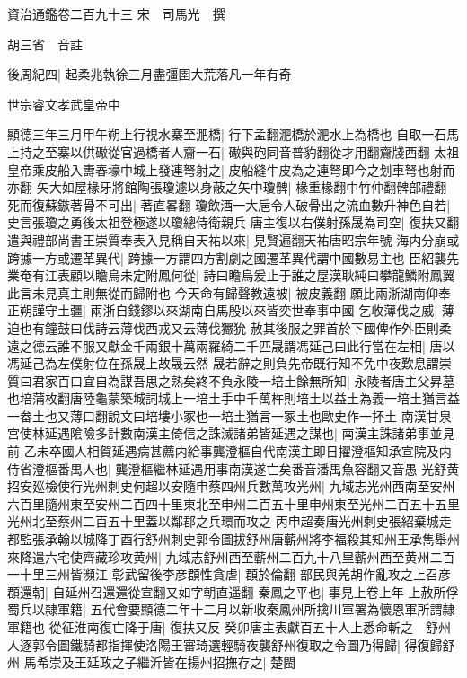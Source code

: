資治通鑑卷二百九十三
宋　司馬光　撰

胡三省　音註

後周紀四|{
	起柔兆執徐三月盡彊圉大荒落凡一年有奇}


世宗睿文孝武皇帝中

顯德三年三月甲午朔上行視水寨至淝橋|{
	行下孟翻淝橋於淝水上為橋也}
自取一石馬上持之至寨以供礮從官過橋者人齎一石|{
	礮與砲同音普豹翻從才用翻齎牋西翻}
太祖皇帝乘皮船入夀春壕中城上發連弩射之|{
	皮船縫牛皮為之連弩即今之划車弩也射而亦翻}
矢大如屋椽牙將館陶張瓊遽以身蔽之矢中瓊髀|{
	椽重椽翻中竹仲翻髀部禮翻}
死而復蘇鏃著骨不可出|{
	著直畧翻}
瓊飲酒一大巵令人破骨出之流血數升神色自若|{
	史言張瓊之勇後太祖登極遂以瓊總侍衛親兵}
唐主復以右僕射孫晟為司空|{
	復扶又翻}
遣與禮部尚書王崇質奉表入見稱自天祐以來|{
	見賢遍翻天祐唐昭宗年號}
海内分崩或跨據一方或遷革異代|{
	跨據一方謂四方割劇之國遷革異代謂中國數易主也}
臣紹襲先業奄有江表顧以瞻烏未定附鳳何從|{
	詩曰瞻烏爰止于誰之屋漢耿純曰攀龍鱗附鳳翼此言未見真主則無從而歸附也}
今天命有歸聲教遠被|{
	被皮義翻}
願比兩浙湖南仰奉正朔謹守土疆|{
	兩浙自錢鏐以來湖南自馬殷以來皆奕世奉事中國}
乞收薄伐之威|{
	薄迫也有鐘鼓曰伐詩云薄伐西戎又云薄伐玁狁}
赦其後服之罪首於下國俾作外臣則柔遠之德云誰不服又獻金千兩銀十萬兩羅綺二千匹晟謂馮延己曰此行當在左相|{
	唐以馮延己為左僕射位在孫晟上故晟云然}
晟若辭之則負先帝既行知不免中夜歎息謂崇質曰君家百口宜自為謀吾思之熟矣終不負永陵一培土餘無所知|{
	永陵者唐主父昇墓也培蒲枚翻唐陸龜蒙築城詞城上一培土手中千萬杵則培土以益土為義一培土猶言益一畚土也又薄口翻說文曰培塿小冢也一培土猶言一冢土也歐史作一抔土}
南漢甘泉宫使林延遇隂險多計數南漢主倚信之誅滅諸弟皆延遇之謀也|{
	南漢主誅諸弟事並見前}
乙未卒國人相賀延遇病甚薦内給事龔澄樞自代南漢主即日擢澄樞知承宣院及内侍省澄樞番禺人也|{
	龔澄樞繼林延遇用事南漢遂亡矣番音潘禺魚容翻又音愚}
光舒黄招安廵檢使行光州刺史何超以安隨申蔡四州兵數萬攻光州|{
	九域志光州西南至安州六百里隨州東至安州二百四十里東北至申州二百五十里申州東至光州二百五十五里光州北至蔡州二百五十里蓋以鄰郡之兵環而攻之}
丙申超奏唐光州刺史張紹棄城走都監張承翰以城降丁酉行舒州刺史郭令圖拔舒州唐蘄州將李福殺其知州王承雋舉州來降遣六宅使齊藏珍攻黄州|{
	九域志舒州西至蘄州二百九十八里蘄州西至黄州二百一十里三州皆瀕江}
彰武留後李彦頵性貪虐|{
	頵於倫翻}
部民與羌胡作亂攻之上召彦頵還朝|{
	自延州召還還從宣翻又如字朝直遥翻}
秦鳳之平也|{
	事見上卷上年}
上赦所俘蜀兵以隸軍籍|{
	五代會要顯德二年十二月以新收秦鳳州所擒川軍署為懷恩軍所謂隸軍籍也}
從征淮南復亡降于唐|{
	復扶又反}
癸卯唐主表獻百五十人上悉命斬之　舒州人逐郭令圖鐵騎都指揮使洛陽王審琦選輕騎夜襲舒州復取之令圖乃得歸|{
	得復歸舒州}
馬希崇及王延政之子繼沂皆在揚州招撫存之|{
	楚閩}


